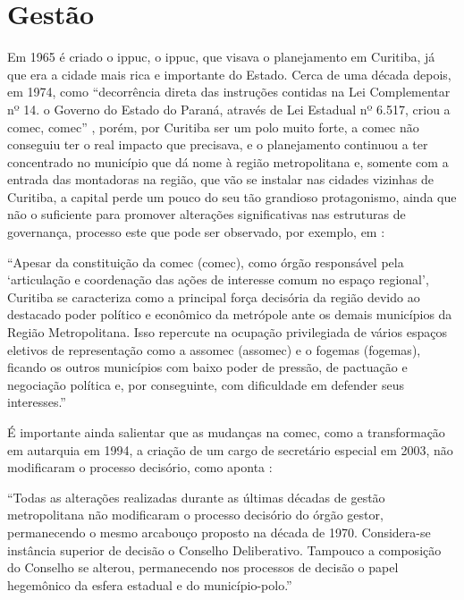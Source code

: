 	\section{Gestão}
	
	Em 1965 é criado o \glsdesc{ippuc}, o \gls{ippuc}, que  visava o planejamento em Curitiba, já que era a cidade mais rica e importante do Estado. Cerca de uma década depois, em 1974, como ``decorrência direta das instruções contidas na Lei Complementar nº 14. o Governo do Estado do Paraná, através de Lei Estadual nº 6.517, criou a \glsdesc{comec}, \gls{comec}'' \cite{comec2019b}, porém, por Curitiba ser um polo muito forte, a \gls{comec} não conseguiu ter o real impacto que precisava, e o planejamento continuou a ter concentrado no município que dá nome à região metropolitana e, somente com a entrada das montadoras na região, que vão se instalar nas cidades vizinhas de Curitiba, a capital perde um pouco do seu tão grandioso protagonismo, ainda que não o suficiente para promover alterações significativas nas estruturas de governança, processo este que pode ser observado, por exemplo, em :

	\begin{citacao}
		``Apesar da constituição da \glsdesc{comec} (\gls{comec}), como órgão responsável pela `articulação e coordenação das ações de interesse comum no espaço regional', Curitiba se caracteriza como a principal força decisória da região devido ao destacado poder político e econômico da metrópole ante os demais municípios da Região Metropolitana. Isso repercute na ocupação privilegiada de vários espaços eletivos de representação como a \glsdesc{assomec} (\gls{assomec}) e o \glsdesc{fogemas} (\gls{fogemas}), ficando os outros municípios com baixo poder de pressão, de pactuação e negociação política e, por conseguinte, com dificuldade em defender seus interesses.'' \cite[p. 84]{colin2009a}
	\end{citacao}

	É importante ainda salientar que as mudanças na \gls{comec}, como a transformação em autarquia em 1994, a criação de um cargo de secretário especial em 2003, não modificaram o processo decisório, como aponta \cite[p. 21]{costa2015b}:
	
	\begin{citacao}
		``Todas as alterações realizadas durante as últimas décadas de gestão metropolitana não modificaram o processo decisório do órgão gestor, permanecendo o mesmo arcabouço proposto na década de 1970. Considera-se instância superior de decisão o Conselho Deliberativo. Tampouco a composição do Conselho se alterou, permanecendo nos processos de decisão o papel hegemônico da esfera estadual e do município-polo.''
	\end{citacao}
	
